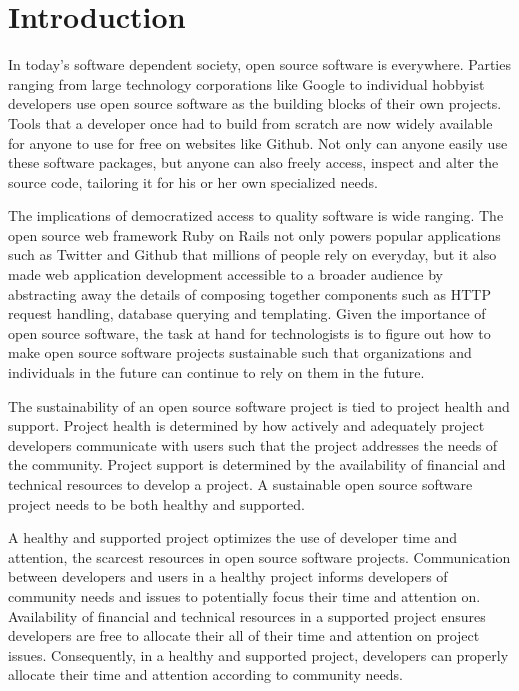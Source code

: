 \section{Introduction}

In today's software dependent society, open source software is everywhere.
Parties ranging from large technology corporations like Google to individual
hobbyist developers use open source software as the building blocks of their own
projects. Tools that a developer once had to build from scratch are now widely
available for anyone to use for free on websites like Github. Not only can
anyone easily use these software packages, but anyone can also freely access,
inspect and alter the source code, tailoring it for his or her own specialized needs.

The implications of democratized access to quality software is wide ranging. The
open source web framework Ruby on Rails not only powers popular applications
such as Twitter and Github that millions of people rely on everyday, but it also
made web application development accessible to a broader audience by abstracting
away the details of composing together components such as HTTP request handling,
database querying and templating. Given the importance of open source software,
the task at hand for technologists is to figure out how to make open source
software projects sustainable such that organizations and individuals in the
future can continue to rely on them in the future.

The sustainability of an open source software project is tied to project health
and support. Project health is determined by how actively and adequately project
developers communicate with users such that the project
addresses the needs of the community. Project support is determined by the
availability of financial and technical resources to develop a project\cite{successOSS}. A sustainable
open source software project needs to be both healthy and supported.

A healthy and supported project optimizes the use of developer time and
attention, the scarcest resources in open source software projects.
Communication between developers and users in a healthy project informs
developers of community needs and issues to potentially focus their time and
attention on. Availability of financial and technical resources in a supported
project ensures developers are free to allocate their all of their time and attention on
project issues. Consequently, in a healthy and supported project, developers can
properly allocate their time and attention according to community needs.

